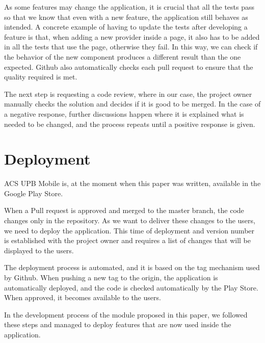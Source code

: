 As some features may change the application, it is crucial that all the tests pass so that we know that even with a new feature, the application still behaves as intended. A concrete example of having to update the tests after developing a feature is that, when adding a new provider inside a page, it also has to be added in all the tests that use the page, otherwise they fail. In this way, we can check if the behavior of the new component produces a different result than the one expected. 
Github also automatically checks each pull request to ensure that the quality required is met.

The next step is requesting a code review, where in our case, the project owner manually checks the solution and decides if it is good to be merged. In the case of a negative response, further discussions happen where it is explained what is needed to be changed, and the process repeats until a positive response is given.

\section{Deployment} \label{6:deploy}


ACS UPB Mobile is, at the moment when this paper was written, available in the Google Play Store.

When a Pull request is approved and merged to the master branch, the code changes only in the repository. As we want to deliver these changes to the users, we need to deploy the application. This time of deployment and version number is established with the project owner and requires a list of changes that will be displayed to the users.

The deployment process is automated, and it is based on the tag mechanism used by Github. When pushing a new tag to the origin, the application is automatically deployed, and the code is checked automatically by the Play Store. When approved, it becomes available to the users. 


In the development process of the module proposed in this paper, we followed these steps and managed to deploy features that are now used inside the application. 

